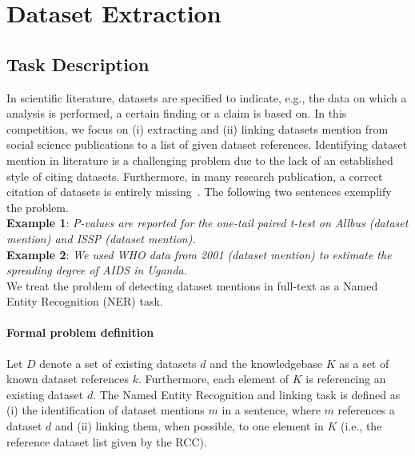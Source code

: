 \section{Dataset Extraction}
\label{sec:dataset-extraction}
\subsection{Task Description}
In scientific literature, datasets are specified to indicate, e.g., the data on which a analysis is performed, a certain finding or a claim is based on. In this competition, we focus on (i) extracting and (ii) linking datasets mention from social science publications to a list of given dataset references.
Identifying dataset mention in literature is a challenging problem due to the lack of an established style of citing datasets.
Furthermore, in many research publication, a correct citation of datasets is entirely missing~\cite{boland2012identifying}. 
The following two sentences exemplify the problem.\\ 
\textbf{Example 1}: \emph{P-values are reported for the one-tail paired t-test on \emph{Allbus} (dataset mention) and \emph{ISSP} (dataset mention).}\\
\textbf{Example 2}: \emph{We used \emph{WHO data from 2001} (dataset mention) to estimate the spreading degree of AIDS in Uganda.}\\
We treat the problem of detecting dataset mentions in full-text as a Named Entity Recognition (NER) task. 

\paragraph{Formal problem definition}%
Let $D$ denote a set of existing datasets $d$ and the knowledgebase $K$ as a set of known dataset references $k$. Furthermore, each element of $K$ is referencing an existing dataset $d$. The Named Entity Recognition and linking task is defined as (i) the identification of dataset mentions $m$ in a sentence, where $m$ references a dataset $d$ and (ii) linking them, when possible, to one element in $K$ (i.e., the reference dataset list given by the RCC). 


